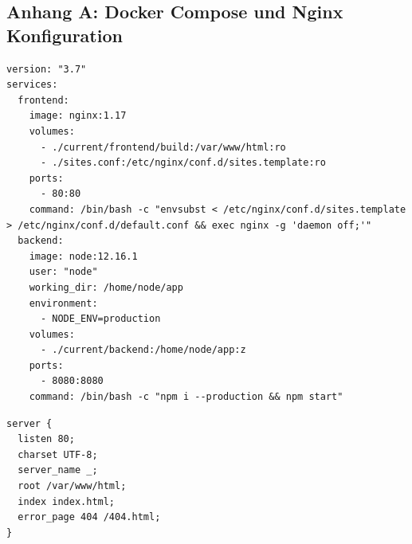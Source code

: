 \documentclass[11pt,a4paper,german]{scrartcl}
\begin{document}
\subsection{Anhang A: Docker Compose und Nginx Konfiguration}
\label{Anhang-A}

\begin{lstlisting}[caption={Docker Compose},captionpos=b]
version: "3.7"
services:
  frontend:
    image: nginx:1.17
    volumes:
      - ./current/frontend/build:/var/www/html:ro
      - ./sites.conf:/etc/nginx/conf.d/sites.template:ro
    ports:
      - 80:80
    command: /bin/bash -c "envsubst < /etc/nginx/conf.d/sites.template > /etc/nginx/conf.d/default.conf && exec nginx -g 'daemon off;'"
  backend:
    image: node:12.16.1
    user: "node"
    working_dir: /home/node/app
    environment:
      - NODE_ENV=production
    volumes:
      - ./current/backend:/home/node/app:z
    ports:
      - 8080:8080
    command: /bin/bash -c "npm i --production && npm start"
\end{lstlisting}

\begin{lstlisting}[caption={Nginx},captionpos=b]
server {
  listen 80;
  charset UTF-8;
  server_name _;
  root /var/www/html;
  index index.html;
  error_page 404 /404.html;
}
\end{lstlisting}
\end{document}
